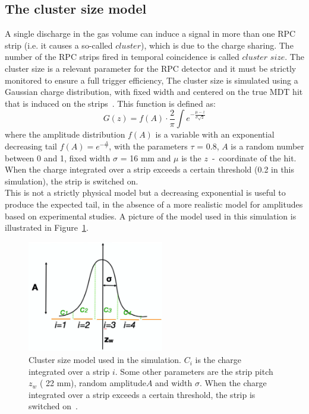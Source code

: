 \subsection{The cluster size model}
\label{sec:CSM}
A single discharge in the gas volume can induce a signal in more than
one RPC strip (i.e. it causes a so-called $cluster$), which is due to the charge sharing.
The number of the RPC strips fired in temporal coincidence is called $cluster$ $size$. 
The cluster size is a relevant parameter for the RPC detector and it must be strictly monitored to 
ensure a full trigger efficiency,
The cluster size is simulated using a Gaussian charge distribution, with fixed width and centered on the true MDT hit that is induced on the strips~\cite{MuonWeek22Oct}. 
This function is defined as:
\begin{equation}
G(z)=f(A)\cdot \frac{2}{\pi} \int{e^{-\frac{\mu-z}{\sigma\sqrt{2}}}}
\end{equation}
where the amplitude distribution $f(A)$ is a variable with an exponential decreasing tail $f(A)=e^{-\frac{A}{\tau}}$, with the parameters $\tau$ = 0.8, $A$ is a random number between 0 and 1, fixed width $\sigma$ = 16 mm and $\mu$ is the $z$~-~coordinate of the hit.
When the charge integrated over a strip exceeds a certain threshold (0.2 in this simulation), the strip is switched on.\\
This is not a strictly physical model but a decreasing exponential is useful to produce the expected tail, in the absence of a more realistic model for amplitudes
based on experimental studies. A picture of the model used in this simulation is illustrated in Figure~\ref{fig:csm_pic}.
\begin{figure}[!h]
	\centering
	\includegraphics[width=0.53\textwidth]{Chapters/CH3/figures/csm_pic}
	\caption{Cluster size model used in the simulation. $C_i$ is the charge integrated over a strip $i$. 
		Some other parameters are the strip pitch $z_w$ ( 22 mm), random amplitude$A$ and width $\sigma$. When the charge integrated over a strip exceeds a certain threshold, the strip is switched on~\cite{MuonWeek22Oct}.}
	\label{fig:csm_pic}
\end{figure}
